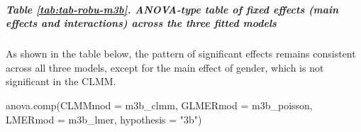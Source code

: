 \documentclass[
  bookmarksnumbered]{article}
\newenvironment{Shaded}{\begin{snugshade}}{\end{snugshade}}
\newcommand{\AttributeTok}[1]{\textcolor[rgb]{0.80,0.80,0.80}{#1}}
\newcommand{\FunctionTok}[1]{\textcolor[rgb]{0.94,0.94,0.56}{#1}}
\newcommand{\NormalTok}[1]{\textcolor[rgb]{0.80,0.80,0.80}{#1}}
\newcommand{\StringTok}[1]{\textcolor[rgb]{0.80,0.58,0.58}{#1}}
\begin{document}
\subparagraph{Table \ref{tab:tab-robu-m3b}. ANOVA-type table of fixed effects (main effects and interactions) across the three fitted models}\label{table-reftabtab-robu-m3b.-anova-type-table-of-fixed-effects-main-effects-and-interactions-across-the-three-fitted-models}

As shown in the table below, the pattern of significant effects remains consistent across all three models, except for the main effect of gender, which is not significant in the CLMM.

\begin{Shaded}
\begin{Highlighting}[]
\FunctionTok{anova.comp}\NormalTok{(}\AttributeTok{CLMMmod =}\NormalTok{ m3b\_clmm, }\AttributeTok{GLMERmod =}\NormalTok{ m3b\_poisson, }\AttributeTok{LMERmod =}\NormalTok{ m3b\_lmer, }\AttributeTok{hypothesis =} \StringTok{"3b"}\NormalTok{)}
\end{Highlighting}
\end{Shaded}
\end{document}
